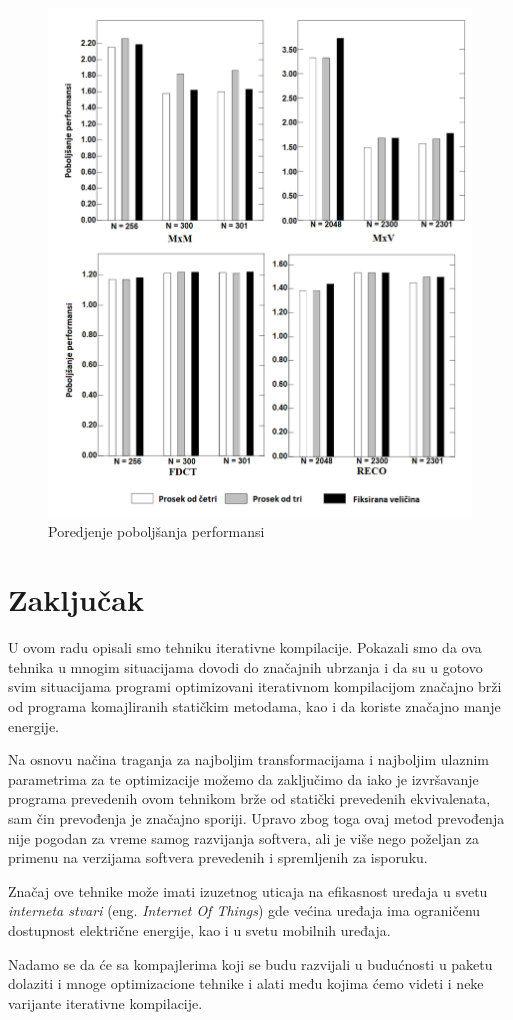 \documentclass[a4paper]{article}
\begin{document}
\begin{figure}[h]
\includegraphics[scale=0.5]{performanse3}
\caption{Poredjenje poboljšanja performansi}
\label{fig:slika4}
\end{figure}

\newpage
\section{Zaključak}
\label{sec:zakljucak}
U ovom radu opisali smo tehniku iterativne kompilacije. 
Pokazali smo da ova tehnika u mnogim situacijama dovodi 
do značajnih ubrzanja i da su u gotovo svim situacijama 
programi optimizovani iterativnom kompilacijom značajno 
brži od programa komajliranih statičkim metodama, kao i da koriste
značajno manje energije.
\par
Na osnovu načina traganja za najboljim transformacijama 
i najboljim ulaznim parametrima za te optimizacije možemo da zaključimo
da iako je izvršavanje programa prevedenih ovom tehnikom brže
od statički prevedenih ekvivalenata, sam čin prevođenja je značajno sporiji. 
Upravo zbog toga ovaj metod prevođenja nije pogodan za vreme samog
razvijanja softvera, 
ali je više nego poželjan za primenu na verzijama softvera prevedenih 
i spremljenih za isporuku.
\par
Značaj ove tehnike može imati izuzetnog uticaja
na efikasnost uređaja u svetu \emph{interneta stvari} (eng. \emph{Internet Of Things}) 
gde većina uređaja ima ograničenu dostupnost električne energije, kao i u svetu 
mobilnih uređaja.
\par
Nadamo se da će sa kompajlerima koji se budu razvijali u budućnosti u paketu 
dolaziti i mnoge optimizacione tehnike i alati među kojima ćemo videti i
neke varijante iterativne kompilacije.
\appendix
 

\end{document}
